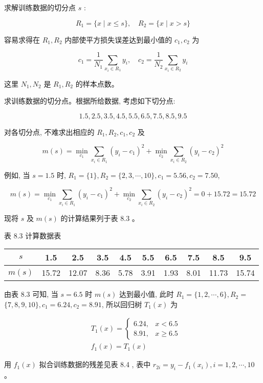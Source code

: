 \documentclass[10pt]{article}
\begin{document}
求解训练数据的切分点 $s$ :

$$
R_{1}=\{x \mid x \leqslant s\}, \quad R_{2}=\{x \mid x>s\}
$$

容易求得在 $R_{1}, R_{2}$ 内部使平方损失误差达到最小值的 $c_{1}, c_{2}$ 为

$$
c_{1}=\frac{1}{N_{1}} \sum_{x_{i} \in R_{1}} y_{i}, \quad c_{2}=\frac{1}{N_{2}} \sum_{x_{i} \in R_{2}} y_{i}
$$

这里 $N_{1}, N_{2}$ 是 $R_{1}, R_{2}$ 的样本点数。

求训练数据的切分点。根据所给数据, 考虑如下切分点:

$$
1.5,2.5,3.5,4.5,5.5,6.5,7.5,8.5,9.5
$$

对各切分点, 不难求出相应的 $R_{1}, R_{2}, c_{1}, c_{2}$ 及

$$
m(s)=\min _{c_{1}} \sum_{x_{i} \in R_{1}}\left(y_{i}-c_{1}\right)^{2}+\min _{c_{2}} \sum_{x_{i} \in R_{2}}\left(y_{i}-c_{2}\right)^{2}
$$

例如, 当 $s=1.5$ 时, $R_{1}=\{1\}, R_{2}=\{2,3, \cdots, 10\}, c_{1}=5.56, c_{2}=7.50$,

$$
m(s)=\min _{c_{1}} \sum_{x_{i} \in R_{1}}\left(y_{i}-c_{1}\right)^{2}+\min _{c_{2}} \sum_{x_{i} \in R_{2}}\left(y_{i}-c_{2}\right)^{2}=0+15.72=15.72
$$

现将 $s$ 及 $m(s)$ 的计算结果列于表 8.3 。

表 8.3 计算数据表

\begin{center}
\begin{tabular}{cccccccccc}
\hline
$s$ & 1.5 & 2.5 & 3.5 & 4.5 & 5.5 & 6.5 & 7.5 & 8.5 & 9.5 \\
\hline
$m(s)$ & 15.72 & 12.07 & 8.36 & 5.78 & 3.91 & 1.93 & 8.01 & 11.73 & 15.74 \\
\hline
\end{tabular}
\end{center}

由表 8.3 可知, 当 $s=6.5$ 时 $m(s)$ 达到最小值, 此时 $R_{1}=\{1,2, \cdots, 6\}, R_{2}=$ $\{7,8,9,10\}, c_{1}=6.24, c_{2}=8.91$, 所以回归树 $T_{1}(x)$ 为

$$
\begin{aligned}
& T_{1}(x)= \begin{cases}6.24, & x<6.5 \\
8.91, & x \geqslant 6.5\end{cases} \\
& f_{1}(x)=T_{1}(x)
\end{aligned}
$$

用 $f_{1}(x)$ 拟合训练数据的残差见表 8.4 , 表中 $r_{2 i}=y_{i}-f_{1}\left(x_{i}\right), i=1,2, \cdots, 10$ 。
\end{document}
